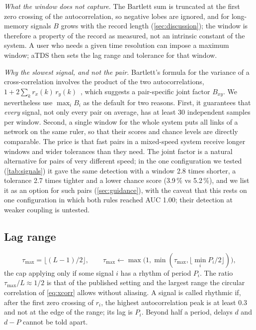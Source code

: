 \documentclass[11pt,a4paper]{article}
\begin{document}
\emph{What the window does not capture.} The Bartlett sum is truncated at the first zero crossing of the autocorrelation, so negative lobes are ignored, and for long-memory signals $B$ grows with the record length (\cref{sec:discussion}); the window is therefore a property of the record as measured, not an intrinsic constant of the system. A user who needs a given time resolution can impose a maximum window; aTDS then sets the lag range and tolerance for that window.

\emph{Why the slowest signal, and not the pair.} Bartlett's formula for the variance of a cross-correlation involves the product of the two autocorrelations, $1 + 2\sum_k r_x(k)\,r_y(k)$~\cite{Bartlett1946TheoreticalSpecification}, which suggests a pair-specific joint factor $B_{xy}$. We nevertheless use $\max_i B_i$ as the default for two reasons. First, it guarantees that \emph{every} signal, not only every pair on average, has at least 30 independent samples per window. Second, a single window for the whole system puts all links of a network on the same ruler, so that their scores and chance levels are directly comparable. The price is that fast pairs in a mixed-speed system receive longer windows and wider tolerances than they need. The joint factor is a natural alternative for pairs of very different speed; in the one configuration we tested (\cref{tab:signals}) it gave the same detection with a window 2.8 times shorter, a tolerance 2.7 times tighter and a lower chance score (3.9\,\% vs 5.2\,\%), and we list it as an option for such pairs (\cref{sec:guidance}), with the caveat that this rests on one configuration in which both rules reached AUC 1.00; their detection at weaker coupling is untested.

\subsection{Lag range}
\label{sec:lag}
\begin{equation}
\tau_{\max} = \big\lfloor (L-1)/2 \big\rfloor, \qquad \tau_{\max} \leftarrow \max\!\big(1, \min(\tau_{\max}, \lfloor \min_i P_i / 2 \rfloor)\big),
\end{equation}
the cap applying only if some signal $i$ has a rhythm of period $P_i$.
The ratio $\tau_{\max} / L \approx 1/2$ is that of the published setting and the largest range the circular correlation of \cref{eq:xcorr} allows without aliasing. A signal is called rhythmic if, after the first zero crossing of $r_i$, the highest autocorrelation peak is at least 0.3 and not at the edge of the range; its lag is $P_i$. Beyond half a period, delays $d$ and $d - P$ cannot be told apart.
\end{document}
